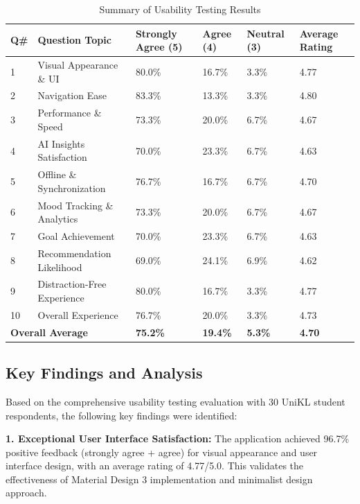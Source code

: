 \begin{table}[H]
\centering
\caption{Summary of Usability Testing Results}
\label{tab:usability-summary}
\begin{tabular}{|p{1cm}|p{8cm}|p{1.5cm}|p{1.5cm}|p{1.5cm}|p{1.5cm}|}
\hline
\textbf{Q\#} & \textbf{Question Topic} & \textbf{Strongly Agree (5)} & \textbf{Agree (4)} & \textbf{Neutral (3)} & \textbf{Average Rating} \\
\hline
1 & Visual Appearance \& UI & 80.0\% & 16.7\% & 3.3\% & 4.77 \\
\hline
2 & Navigation Ease & 83.3\% & 13.3\% & 3.3\% & 4.80 \\
\hline
3 & Performance \& Speed & 73.3\% & 20.0\% & 6.7\% & 4.67 \\
\hline
4 & AI Insights Satisfaction & 70.0\% & 23.3\% & 6.7\% & 4.63 \\
\hline
5 & Offline \& Synchronization & 76.7\% & 16.7\% & 6.7\% & 4.70 \\
\hline
6 & Mood Tracking \& Analytics & 73.3\% & 20.0\% & 6.7\% & 4.67 \\
\hline
7 & Goal Achievement & 70.0\% & 23.3\% & 6.7\% & 4.63 \\
\hline
8 & Recommendation Likelihood & 69.0\% & 24.1\% & 6.9\% & 4.62 \\
\hline
9 & Distraction-Free Experience & 80.0\% & 16.7\% & 3.3\% & 4.77 \\
\hline
10 & Overall Experience & 76.7\% & 20.0\% & 3.3\% & 4.73 \\
\hline
\multicolumn{2}{|l|}{\textbf{Overall Average}} & \textbf{75.2\%} & \textbf{19.4\%} & \textbf{5.3\%} & \textbf{4.70} \\
\hline
\end{tabular}
\end{table}

\subsection{Key Findings and Analysis}\label{sec:keyFindings}

Based on the comprehensive usability testing evaluation with 30 UniKL student respondents, the following key findings were identified:

\textbf{1. Exceptional User Interface Satisfaction:} The application achieved 96.7\% positive feedback (strongly agree + agree) for visual appearance and user interface design, with an average rating of 4.77/5.0. This validates the effectiveness of Material Design 3 implementation and minimalist design approach.

